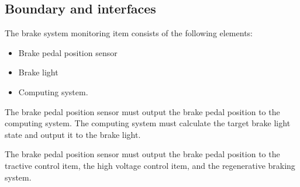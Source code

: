 \subsection{Boundary and interfaces}
%
%
The brake system monitoring item consists of the following elements:
\begin{itemize}
\item Brake pedal position sensor
\item Brake light
\item Computing system.
\end{itemize}
The brake pedal position sensor must output the brake pedal position to the computing system.
The computing system must calculate the target brake light state and output it to the brake light.

The brake pedal position sensor must output the brake pedal position to the tractive control item, the high voltage control item, and the regenerative braking system.
